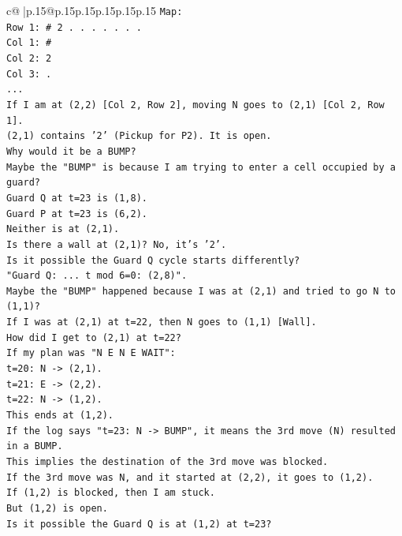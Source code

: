 \documentclass{article}
\begin{document}
{\begin{supertabular}{c@{$\;$}|p{.15\linewidth}@{}p{.15\linewidth}p{.15\linewidth}p{.15\linewidth}p{.15\linewidth}p{.15\linewidth}}
{{{\texttt{Map:} \\
\texttt{Row 1: \# 2 . . . . . . .} \\
\texttt{Col 1: \#} \\
\texttt{Col 2: 2} \\
\texttt{Col 3: .} \\
\texttt{...} \\
\texttt{If I am at (2,2) {[}Col 2, Row 2{]}, moving N goes to (2,1) {[}Col 2, Row 1{]}.} \\
\texttt{(2,1) contains '2' (Pickup for P2). It is open.} \\
\texttt{Why would it be a BUMP?} \\
\texttt{Maybe the "BUMP" is because I am trying to enter a cell occupied by a guard?} \\
\texttt{Guard Q at t=23 is (1,8).} \\
\texttt{Guard P at t=23 is (6,2).} \\
\texttt{Neither is at (2,1).} \\
\texttt{Is there a wall at (2,1)? No, it's '2'.} \\
\texttt{Is it possible the Guard Q cycle starts differently?} \\
\texttt{"Guard Q: ... t mod 6=0: (2,8)".} \\
\texttt{Maybe the "BUMP" happened because I was at (2,1) and tried to go N to (1,1)?} \\
\texttt{If I was at (2,1) at t=22, then N goes to (1,1) {[}Wall{]}.} \\
\texttt{How did I get to (2,1) at t=22?} \\
\texttt{If my plan was "N E N E WAIT":} \\
\texttt{t=20: N {-}> (2,1).} \\
\texttt{t=21: E {-}> (2,2).} \\
\texttt{t=22: N {-}> (1,2).} \\
\texttt{This ends at (1,2).} \\
\texttt{If the log says "t=23: N {-}> BUMP", it means the 3rd move (N) resulted in a BUMP.} \\
\texttt{This implies the destination of the 3rd move was blocked.} \\
\texttt{If the 3rd move was N, and it started at (2,2), it goes to (1,2).} \\
\texttt{If (1,2) is blocked, then I am stuck.} \\
\texttt{But (1,2) is open.} \\
\texttt{Is it possible the Guard Q is at (1,2) at t=23?} \\
}}}
\end{supertabular}}
\end{document}
